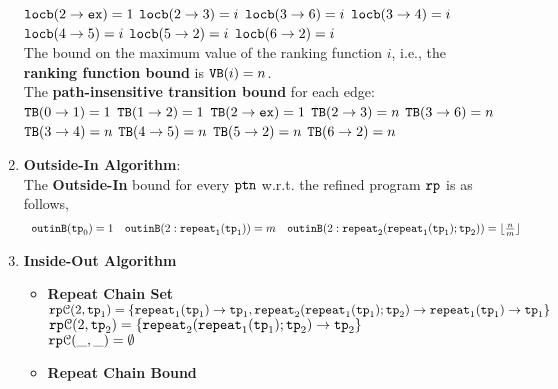 \begin{enumerate}
      $\mathtt{locb}(2 \to \mathtt{ex}) = 1$ 
      \quad $\mathtt{locb}(2 \to 3) = i$ 
      \quad $\mathtt{locb}(3 \to 6) = i$ 
      \quad $\mathtt{locb}(3 \to 4) = i$ 
      \quad $\mathtt{locb}(4 \to 5) = i$ 
      \quad $\mathtt{locb}(5 \to 2) = i$ 
      \quad $\mathtt{locb}(6 \to 2) = i$ 
      \\
  The bound on the maximum value of the ranking function $i$, i.e., the \textbf{ranking function bound} is
    ${\mathtt{VB}}(i) = n$.
    \\
    The \textbf{path-insensitive transition bound} for each edge:
    \\  
      ${\mathtt{TB}}(0 \to 1) = 1$
      \quad ${\mathtt{TB}}(1 \to 2) = 1$
      \quad ${\mathtt{TB}}(2 \to \mathtt{ex}) = 1$ 
      \quad ${\mathtt{TB}}(2 \to 3) = n$ 
      \quad ${\mathtt{TB}}(3 \to 6) = n$ 
      \\
      \quad ${\mathtt{TB}}(3 \to 4) = n$ 
      \quad ${\mathtt{TB}}(4 \to 5) = n$ 
      \quad ${\mathtt{TB}}(5 \to 2) = n$ 
      \quad ${\mathtt{TB}}(6 \to 2) = n$ 
  \item \textbf{Outside-In Algorithm}:\\
  The \textbf{Outside-In} bound for every $\mathtt{ptn}$ w.r.t. the refined program $\mathtt{rp}$ is as follows,
  \[
    \begin{array}{lll}
        \mathtt{outinB}(\mathtt{tp}_0) = 1
        &
        \mathtt{outinB}(2: \mathtt{repeat}_1(\mathtt{tp}_1)) = m 
        &
        \mathtt{outinB}(2: \mathtt{repeat}_2(\mathtt{repeat}_1(\mathtt{tp}_1); \mathtt{tp}_2)) = \lfloor\frac{n}{m}\rfloor
\end{array}
\]
\item \textbf{Inside-Out Algorithm}
\begin{itemize}
  \item \textbf{Repeat Chain Set}
  \\
  $\mathtt{rp}\mathcal{C}(2, \mathtt{tp}_1) = \{\mathtt{repeat}_1(\mathtt{tp}_1) \to \mathtt{tp}_1, \mathtt{repeat}_2(\mathtt{repeat}_1(\mathtt{tp}_1); \mathtt{tp}_2) \to \mathtt{repeat}_1(\mathtt{tp}_1) \to \mathtt{tp}_1\}$ \\
  $\mathtt{rp}\mathcal{C}(2, \mathtt{tp}_2) = \{\mathtt{repeat}_2(\mathtt{repeat}_1(\mathtt{tp}_1); \mathtt{tp}_2) \to  \mathtt{tp}_2\}$ \\
  $\mathtt{rp}\mathcal{C}(\_, \_) = \emptyset$ 
  \item \textbf{Repeat Chain Bound}

\end{itemize}
\end{enumerate}

